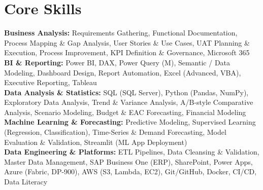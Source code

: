 \documentclass[10.5pt,letterpaper]{article}
\begin{document}
\section{Core Skills}
\noindent
\textbf{Business Analysis:} Requirements Gathering, Functional Documentation, Process Mapping \& Gap Analysis, User Stories \& Use Cases, UAT Planning \& Execution, Process Improvement, KPI Definition \& Governance, Microsoft 365\\\textbf{BI \& Reporting:} Power BI, DAX, Power Query (M), Semantic / Data Modeling, Dashboard Design, Report Automation, Excel (Advanced, VBA), Executive Reporting, Tableau\\\textbf{Data Analysis \& Statistics:} SQL (SQL Server), Python (Pandas, NumPy), Exploratory Data Analysis, Trend \& Variance Analysis, A/B-style Comparative Analysis, Scenario Modeling, Budget \& EAC Forecasting, Financial Modeling\\\textbf{Machine Learning \& Forecasting:} Predictive Modeling, Supervised Learning (Regression, Classification), Time-Series \& Demand Forecasting, Model Evaluation \& Validation, Streamlit (ML App Deployment)\\\textbf{Data Engineering \& Platforms:} ETL Pipelines, Data Cleansing \& Validation, Master Data Management, SAP Business One (ERP), SharePoint, Power Apps, Azure (Fabric, DP-900), AWS (S3, Lambda, EC2), Git/GitHub, Docker, CI/CD, Data Literacy
\end{document}
